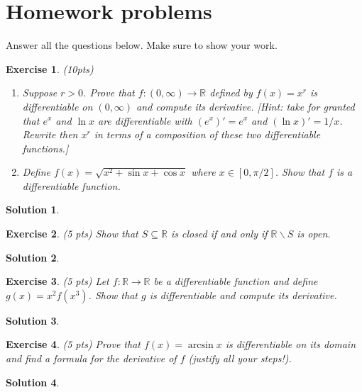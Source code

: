\documentclass[12pt]{article}
\newcommand{\bR}{\mathbb{R}}
\newcommand{\ra}{\rightarrow}
\theoremstyle{plain}
\newtheorem{exer}{\textbf{Exercise}}}
\theoremstyle{plain}
\newtheorem*{sol}{\textbf{Solution}}}
\begin{document}
\section{Homework problems}
Answer all the questions below. Make sure to show your work.

\begin{exer}
(10pts)
\begin{enumerate}[label=\textbf{\alph*)}]
\item Suppose $r > 0$. Prove that $f : (0, \infty ) \ra \bR$ defined by $f(x) = x^r$ is differentiable on $(0, \infty )$ and compute its derivative. [Hint: take for granted that $e^x$ and $\ln x$ are differentiable with $(e^x)' = e^x$ and $(\ln x)' = 1/x$. Rewrite then $x^r$ in terms of a composition of these two differentiable functions.]
\item Define $f(x) = \sqrt{x^2 + \sin x + \cos x}$ where $x \in [0, \pi/2 ]$. Show that $f$ is a differentiable function.
\end{enumerate}
\end{exer}
\begin{sol}

\end{sol}

\begin{exer}
(5 pts)
Show that $S \subseteq \bR$ is closed if and only if $\bR \backslash S$ is open.
\end{exer}
\begin{sol}

\end{sol}

\begin{exer}
(5 pts)
Let $f : \bR \ra \bR$ be a differentiable function and define $g(x) = x^2 f(x^3)$. Show that $g$ is differentiable and compute its derivative.
\end{exer}
\begin{sol}

\end{sol}

\begin{exer}
(5 pts)
Prove that $f(x) = \arcsin x$ is differentiable on its domain and find a formula for the derivative of $f$ (justify all your steps!).
\end{exer}
\begin{sol}

\end{sol}
\end{document}
